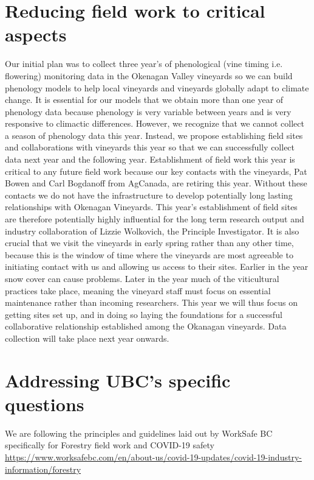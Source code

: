 \documentclass[11pt,letter]{article}
\begin{document}
\section{Reducing field work to critical aspects}
Our initial plan was to collect three year's of phenological (vine timing i.e. flowering) monitoring data in the Okenagan Valley vineyards so we can build phenology models to help local vineyards and vineyards globally adapt to climate change. It is essential for our models that we obtain more than one year of phenology data because phenology is very variable between years and is very responsive to climactic differences. However, we recognize that we cannot collect a season of phenology data this year. Instead, we propose establishing field sites and collaborations with vineyards this year so that we can successfully collect data next year and the following year. Establishment of field work this year is critical to any future field work because our key contacts  with the vineyards, Pat Bowen and Carl Bogdanoff from AgCanada, are retiring this year. Without these contacts we do not have the infrastructure to develop potentially long lasting relationships with Okenagan Vineyards. This year's establishment of field sites are therefore potentially highly influential for the long term research output and industry collaboration of Lizzie Wolkovich, the Principle Investigator. It is also crucial that we visit the vineyards in early spring rather than any other time, because this is the window of time where the vineyards are most agreeable to initiating contact with us and allowing us access to their sites. Earlier in the year snow cover can cause problems. Later in the year much of the viticultural practices take place, meaning the vineyard staff must focus on essential maintenance rather than incoming researchers. This year we will thus focus on getting sites set up, and in doing so laying the foundations for a successful collaborative relationship established among the Okanagan vineyards. Data collection will take place next year onwards.

\section{Addressing UBC's specific questions}
We are following the principles and guidelines laid out by WorkSafe BC specifically for Forestry field work and COVID-19 safety \url{https://www.worksafebc.com/en/about-us/covid-19-updates/covid-19-industry-information/forestry} \\
\end{document}
